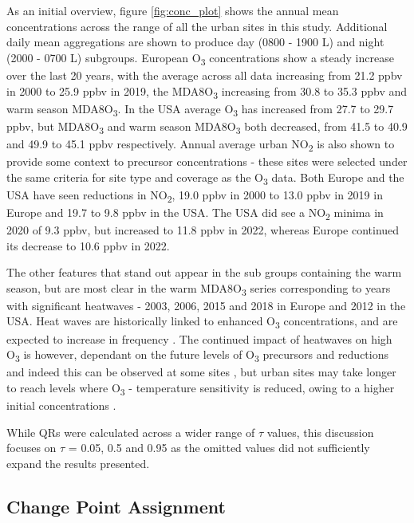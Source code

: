 \documentclass[journal abbreviation, manuscript]{copernicus}
\begin{document}
As an initial overview, figure \ref{fig:conc_plot} shows the annual mean concentrations across the range of all the urban sites in this study. Additional daily mean aggregations are shown to produce day (0800 - 1900 L) and night (2000 - 0700 L) subgroups. European O\textsubscript{3} concentrations show a steady increase over the last 20 years, with the average across all data increasing from 21.2 ppbv in 2000 to 25.9 ppbv in 2019, the MDA8O\textsubscript{3} increasing from 30.8 to 35.3 ppbv and warm season MDA8O\textsubscript{3}. In the USA average O\textsubscript{3} has increased from 27.7 to 29.7 ppbv, but MDA8O\textsubscript{3} and warm season MDA8O\textsubscript{3} both decreased, from 41.5 to 40.9 and 49.9 to 45.1 ppbv respectively. Annual average urban NO\textsubscript{2} is also shown to provide some context to precursor concentrations - these sites were selected under the same criteria for site type and coverage as the O\textsubscript{3} data. Both Europe and the USA have seen reductions in NO\textsubscript{2}, 19.0 ppbv in 2000 to 13.0 ppbv in 2019 in Europe and 19.7 to 9.8 ppbv in the USA. The USA did see a NO\textsubscript{2} minima in 2020 of 9.3 ppbv, but increased to 11.8 ppbv in 2022, whereas Europe continued its decrease to 10.6 ppbv in 2022. 

The other features that stand out appear in the sub groups containing the warm season, but are most clear in the warm MDA8O\textsubscript{3} series corresponding to years with significant heatwaves - 2003, 2006, 2015 and 2018 in Europe and 2012 in the USA. Heat waves are historically linked to enhanced O\textsubscript{3} concentrations, and are expected to increase in frequency \citep{Schär2004, Russo_2015, https://doi.org/10.1002/2016GL068432, Otero_2016, GOULDSBROUGH2022118975}. The continued impact of heatwaves on high O\textsubscript{3} is however, dependant on the future levels of O\textsubscript{3} precursors and reductions and indeed this can be observed at some sites \citep{Meehl_2018, OTERO2021118334, acp-25-2725-2025, acp-25-5101-2025}, but urban sites may take longer to reach levels where O\textsubscript{3} - temperature sensitivity is reduced, owing to a higher initial concentrations \citep{VazquezSantiago2024}. 

While QRs were calculated across a wider range of $\tau$ values, this discussion focuses on $\tau$ = 0.05, 0.5 and 0.95 as the omitted values did not sufficiently expand the results presented.

\subsection{Change Point Assignment} \label{sect:new_mda8_piecewise_types}
\end{document}
